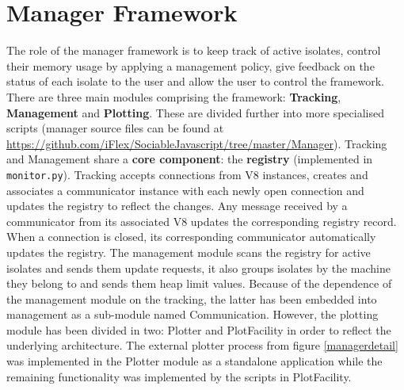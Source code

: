 \documentclass{l4proj}
\begin{document}
\section{Manager Framework}
\hspace*{1em} The role of the manager framework is to keep track of active isolates, control their memory usage by applying a management policy, give feedback on the status of each isolate to the user and allow the user to control the framework. There are three main modules comprising the framework: \textbf{Tracking}, \textbf{Management} and \textbf{Plotting}. These are divided further into more specialised scripts (manager source files can be found at \url{https://github.com/iFlex/SociableJavascript/tree/master/Manager}).
\hspace*{1em} Tracking and Management share a \textbf{core component}: the \textbf{registry} (implemented in \texttt{monitor.py}). Tracking accepts connections from V8 instances, creates and associates a communicator instance with each newly open connection and updates the registry to reflect the changes. Any message received by a communicator from its associated V8 updates the corresponding registry record. When a connection is closed, its corresponding communicator automatically updates the registry. The management module scans the registry for active isolates and sends them update requests, it also groups isolates by the machine they belong to and sends them heap limit values. Because of the dependence of the management module on the tracking, the latter has been embedded into management as a sub-module named Communication. However, the plotting module has been divided in two: Plotter and PlotFacility in order to reflect the underlying architecture. The external plotter process from figure \ref{managerdetail} was implemented in the Plotter module as a standalone application while the remaining functionality was implemented by the scripts in PlotFacility. 
\end{document}
